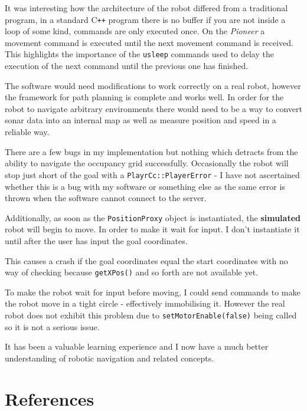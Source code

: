 \documentclass[a4paper,12pt]{article}
\begin{document}
It was interesting how the architecture of the robot differed from a traditional program, in a standard C\texttt{++} program there is no buffer if you are not inside a loop of some kind, commands are only executed once. On the \textit{Pioneer} a movement command is executed until the next movement command is received. This highlights the importance of the \texttt{usleep} commands used to delay the execution of the next command until the previous one has finished.

The software would need modifications to work correctly on a real robot, however the framework for path planning is complete and works well. In order for the robot to navigate arbitrary environments there would need to be a way to convert sonar data into an internal map as well as measure position and speed in a reliable way. 

There are a few bugs in my implementation but nothing which detracts from the ability to navigate the occupancy grid successfully. Occasionally the robot will stop just short of the goal with a \texttt{PlayrCc::PlayerError} - I have not ascertained whether this is a bug with my software or something else as the same error is thrown when the software cannot connect to the server.

Additionally, as soon as the \texttt{PositionProxy} object is instantiated, the \textbf{simulated} robot will begin to move. In order to make it wait for input. I don't instantiate it until after the user has input the goal coordinates. 

This causes a crash if the goal coordinates equal the start coordinates with no way of checking because \texttt{getXPos()} and so forth are not available yet. 

To make the robot wait for input before moving, I could send commands to make the robot move in a tight circle - effectively immobilising it. However the real robot does not exhibit this problem due to \texttt{setMotorEnable(false)} being called so it is not a serious issue.

It has been a valuable learning experience and I now have a much better understanding of robotic navigation and related concepts.
\section{References}

\end{document}
